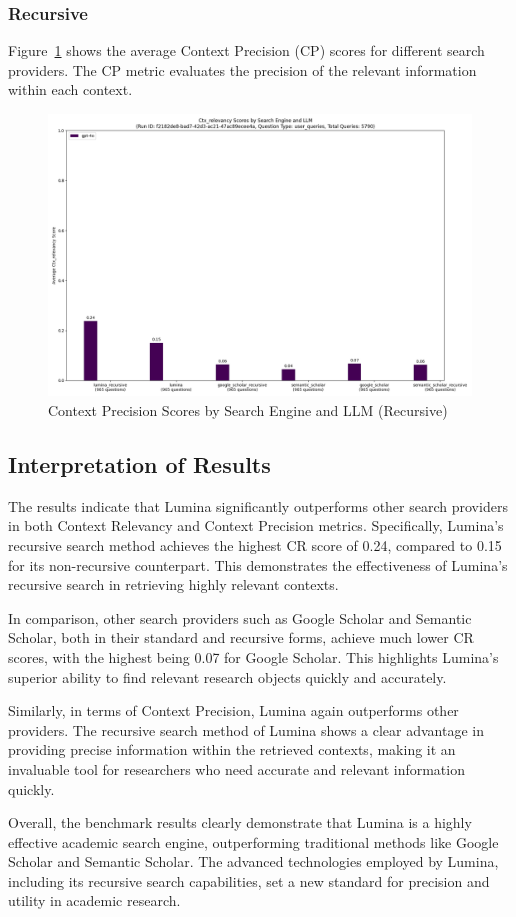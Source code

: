 \documentclass{article}
\begin{document}
\begin{multicols}{2}
\subsubsection{Recursive}
Figure~\ref{fig:recursive_results_recursive} shows the average Context Precision (CP) scores for different search providers. The CP metric evaluates the precision of the relevant information within each context.

\begin{figure}[h]
    \centering
    \includegraphics[width=0.45\columnwidth]{recursive_results.png}
    \caption{Context Precision Scores by Search Engine and LLM (Recursive)}
    \label{fig:recursive_results_recursive}
\end{figure}


\subsection{Interpretation of Results}
The results indicate that Lumina significantly outperforms other search providers in both Context Relevancy and Context Precision metrics. Specifically, Lumina's recursive search method achieves the highest CR score of 0.24, compared to 0.15 for its non-recursive counterpart. This demonstrates the effectiveness of Lumina's recursive search in retrieving highly relevant contexts.

In comparison, other search providers such as Google Scholar and Semantic Scholar, both in their standard and recursive forms, achieve much lower CR scores, with the highest being 0.07 for Google Scholar. This highlights Lumina's superior ability to find relevant research objects quickly and accurately.

Similarly, in terms of Context Precision, Lumina again outperforms other providers. The recursive search method of Lumina shows a clear advantage in providing precise information within the retrieved contexts, making it an invaluable tool for researchers who need accurate and relevant information quickly.

Overall, the benchmark results clearly demonstrate that Lumina is a highly effective academic search engine, outperforming traditional methods like Google Scholar and Semantic Scholar. The advanced technologies employed by Lumina, including its recursive search capabilities, set a new standard for precision and utility in academic research.


\end{multicols}
\end{document}
